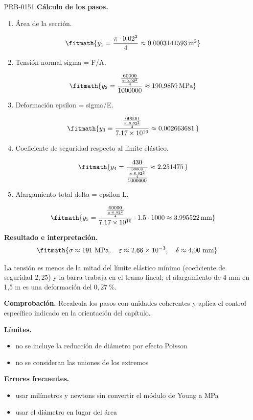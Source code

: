 \begin{studiumworked}{PRB-0151}
\textbf{Cálculo de los pasos.}

\begin{enumerate}

\item Área de la sección.

\[\fitmath{y_{1}=\frac{\pi\cdot {0.02}^{2}}{4}\approx 0.0003141593\,\mathrm{m^{2}}}\]

\item Tensión normal sigma = F/A.

\[\fitmath{y_{2}=\frac{\frac{60000}{\frac{\pi\cdot {0.02}^{2}}{4}}}{1000000}\approx 190.9859\,\mathrm{MPa}}\]

\item Deformación epsilon = sigma/E.

\[\fitmath{y_{3}=\frac{\frac{60000}{\frac{\pi\cdot {0.02}^{2}}{4}}}{7.17\times10^{10}}\approx 0.002663681\,}\]

\item Coeficiente de seguridad respecto al límite elástico.

\[\fitmath{y_{4}=\frac{430}{\frac{\frac{60000}{\frac{\pi\cdot {0.02}^{2}}{4}}}{1000000}}\approx 2.251475\,}\]

\item Alargamiento total delta = epsilon L.

\[\fitmath{y_{5}=\frac{\frac{60000}{\frac{\pi\cdot {0.02}^{2}}{4}}}{7.17\times10^{10}}\cdot 1.5\cdot 1000\approx 3.995522\,\mathrm{mm}}\]

\end{enumerate}

\textbf{Resultado e interpretación.}\[\fitmath{\sigma \approx 191\ \mathrm{MPa},\quad \varepsilon \approx 2{,}66\times 10^{-3},\quad \delta \approx 4{,}00\ \mathrm{mm}}\]

La tensión es menos de la mitad del límite elástico mínimo (coeficiente de seguridad $2{,}25$) y la barra trabaja en el tramo lineal; el alargamiento de 4 mm en 1,5 m es una deformación del $0{,}27\ \%$.

\par\textbf{Comprobación.} Recalcula los pasos con unidades coherentes y aplica el control específico indicado en la orientación del capítulo.

\textbf{Límites.}\begin{itemize}\item no se incluye la reducción de diámetro por efecto Poisson
\item no se consideran las uniones de los extremos\end{itemize}

\textbf{Errores frecuentes.}\begin{itemize}\item usar milímetros y newtons sin convertir el módulo de Young a MPa
\item usar el diámetro en lugar del área\end{itemize}

\end{studiumworked}

